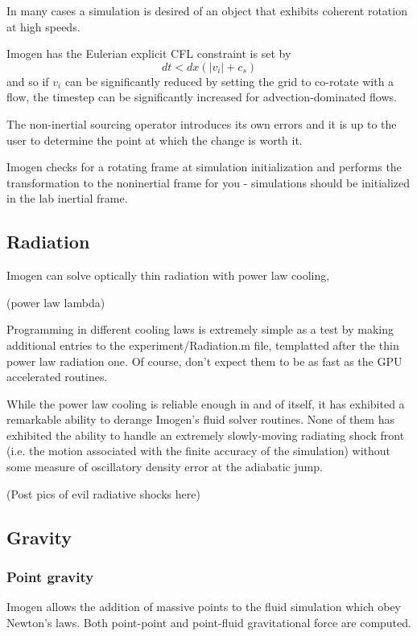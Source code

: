 \documentclass[letterpaper,12pt]{article}
\begin{document}
In many cases a simulation is desired of an object that exhibits coherent rotation at
high speeds.

Imogen has the Eulerian explicit CFL constraint is set by
\[ dt < dx (|v_i| + c_s) \]
and so if $v_i$ can be significantly reduced by setting the grid to co-rotate with a flow,
the timestep can be significantly increased for advection-dominated flows.

The non-inertial sourcing operator introduces its own errors and it is up to the user to
determine the point at which the change is worth it.

Imogen checks for a rotating frame at simulation initialization and performs the
transformation to the noninertial frame for you - simulations should be initialized
in the lab inertial frame.

\subsection{Radiation}

Imogen can solve optically thin radiation with power law cooling,

(power law lambda)

Programming in different cooling laws is extremely simple as a test by making additional
entries to the experiment/Radiation.m file, templatted after the thin power law radiation
one. Of course, don't expect them to be as fast as the GPU accelerated routines.

While the power law cooling is reliable enough in and of itself, it has exhibited a
remarkable ability to derange Imogen's fluid solver routines. None of them has exhibited
the ability to handle an extremely slowly-moving radiating shock front (i.e. the motion
associated with the finite accuracy of the simulation) without some measure of oscillatory
density error at the adiabatic jump.

(Post pics of evil radiative shocks here)

\subsection{Gravity}

\subsubsection{Point gravity}

Imogen allows the addition of massive points to the fluid simulation which obey Newton's
laws. Both point-point and point-fluid gravitational force are computed.
\end{document}

